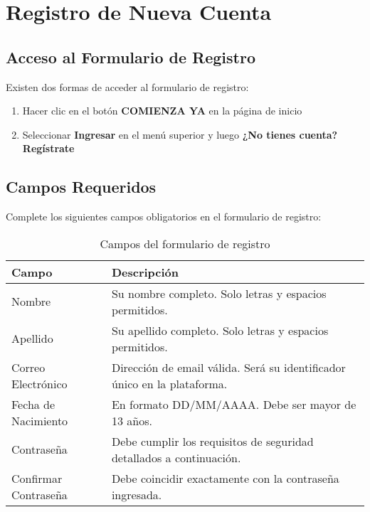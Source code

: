 \documentclass[11pt,a4paper,twoside]{book}
\begin{document}
\chapter{Registro de Nueva Cuenta}

\section{Acceso al Formulario de Registro}

Existen dos formas de acceder al formulario de registro:

\begin{enumerate}
    \item Hacer clic en el botón \textbf{COMIENZA YA} en la página de inicio
    \item Seleccionar \textbf{Ingresar} en el menú superior y luego \textbf{¿No tienes cuenta? Regístrate}
\end{enumerate}

\section{Campos Requeridos}

Complete los siguientes campos obligatorios en el formulario de registro:

\begin{table}[h]
\small
\begin{tabular}{@{}p{4cm}p{10cm}@{}}
\toprule
\textbf{Campo} & \textbf{Descripción} \\ \midrule
Nombre & Su nombre completo. Solo letras y espacios permitidos. \\[0.3cm]
Apellido & Su apellido completo. Solo letras y espacios permitidos. \\[0.3cm]
Correo Electrónico & Dirección de email válida. Será su identificador único en la plataforma. \\[0.3cm]
Fecha de Nacimiento & En formato DD/MM/AAAA. Debe ser mayor de 13 años. \\[0.3cm]
Contraseña & Debe cumplir los requisitos de seguridad detallados a continuación. \\[0.3cm]
Confirmar Contraseña & Debe coincidir exactamente con la contraseña ingresada. \\ \bottomrule
\end{tabular}
\caption{Campos del formulario de registro}
\end{table}
\end{document}

